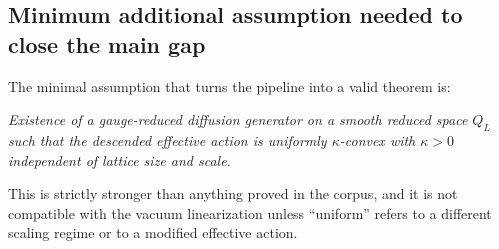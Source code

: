 \documentclass[11pt]{article}
\begin{document}
\subsection*{Minimum additional assumption needed to close the main gap}
The minimal assumption that turns the pipeline into a valid theorem is:

\medskip
\noindent
\emph{Existence of a gauge-reduced diffusion generator on a smooth reduced space $Q_L$ such that the descended effective action is uniformly $\kappa$-convex with $\kappa>0$ independent of lattice size and scale.}
\medskip

This is strictly stronger than anything proved in the corpus, and it is not compatible with the vacuum linearization unless ``uniform'' refers to a different scaling regime or to a modified effective action.
\end{document}

